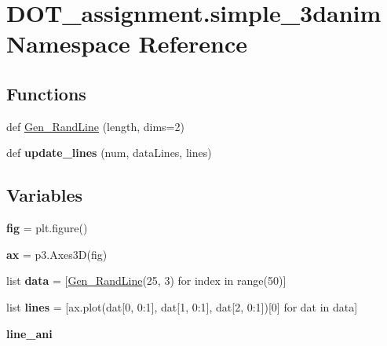 \hypertarget{namespace_d_o_t__assignment_1_1simple__3danim}{}\section{D\+O\+T\+\_\+assignment.\+simple\+\_\+3danim Namespace Reference}
\label{namespace_d_o_t__assignment_1_1simple__3danim}
\subsection*{Functions}
\begin{DoxyCompactItemize}
\item 
def \mbox{\hyperlink{namespace_d_o_t__assignment_1_1simple__3danim_a2d1d08581cfa014bb8a90131d4510545}{Gen\+\_\+\+Rand\+Line}} (length, dims=2)
\item 
\mbox{\label{namespace_d_o_t__assignment_1_1simple__3danim_abded04df9371380e0f66653bd7bf7561}} 
def {\bfseries update\+\_\+lines} (num, data\+Lines, lines)
\end{DoxyCompactItemize}
\subsection*{Variables}
\begin{DoxyCompactItemize}
\item 
\mbox{\label{namespace_d_o_t__assignment_1_1simple__3danim_aa9ce42134d722adef275b8965ab96b70}} 
{\bfseries fig} = plt.\+figure()
\item 
\mbox{\label{namespace_d_o_t__assignment_1_1simple__3danim_a0b6b3f2b61040c3688dd30b15eaba855}} 
{\bfseries ax} = p3.\+Axes3D(fig)
\item 
\mbox{\label{namespace_d_o_t__assignment_1_1simple__3danim_a22db4e804340ee3bded612e17803a88d}} 
list {\bfseries data} = \mbox{[}\mbox{\hyperlink{namespace_d_o_t__assignment_1_1simple__3danim_a2d1d08581cfa014bb8a90131d4510545}{Gen\+\_\+\+Rand\+Line}}(25, 3) for index in range(50)\mbox{]}
\item 
\mbox{\label{namespace_d_o_t__assignment_1_1simple__3danim_a0a2428b22663a69280a744555f083d65}} 
list {\bfseries lines} = \mbox{[}ax.\+plot(dat\mbox{[}0, 0\+:1\mbox{]}, dat\mbox{[}1, 0\+:1\mbox{]}, dat\mbox{[}2, 0\+:1\mbox{]})\mbox{[}0\mbox{]} for dat in data\mbox{]}
\item 
{\bfseries line\+\_\+ani}
\end{DoxyCompactItemize}


